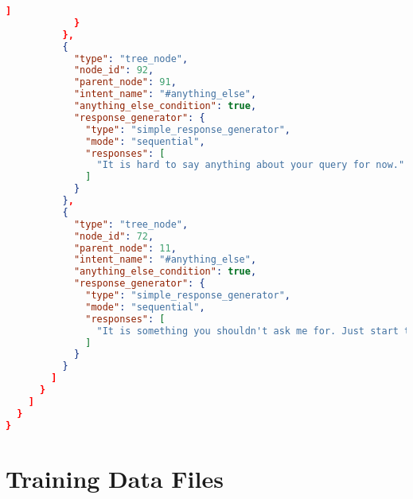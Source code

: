 \begin{appendix}
\begin{lstlisting}[language=json, firstnumber=1]
              ]
            }
          },
          {
            "type": "tree_node",
            "node_id": 92,
            "parent_node": 91,
            "intent_name": "#anything_else",
            "anything_else_condition": true,
            "response_generator": {
              "type": "simple_response_generator",
              "mode": "sequential",
              "responses": [
                "It is hard to say anything about your query for now."
              ]
            }
          },
          {
            "type": "tree_node",
            "node_id": 72,
            "parent_node": 11,
            "intent_name": "#anything_else",
            "anything_else_condition": true,
            "response_generator": {
              "type": "simple_response_generator",
              "mode": "sequential",
              "responses": [
                "It is something you shouldn't ask me for. Just start talking with detective, he is waiting for your greeting message."
              ]
            }
          }
        ]
      }
    ]
  }
}
\end{lstlisting}


\section{Training Data Files\label{appen:trainDF}}

\end{appendix}

